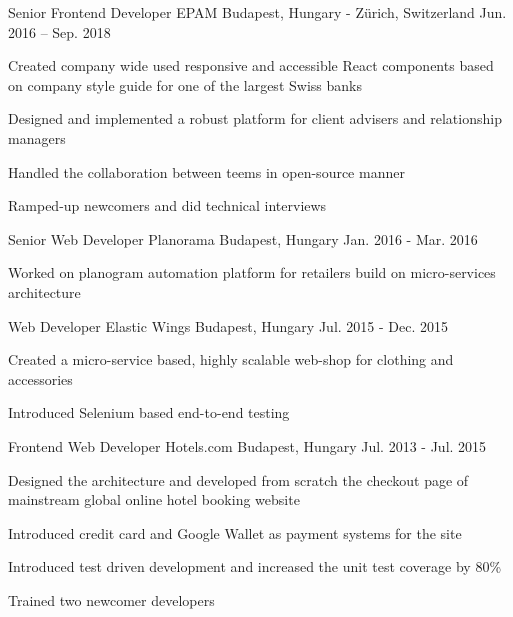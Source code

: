 \begin{cventries}
  \cventry
    {Senior Frontend Developer} %
    {EPAM} %
    {Budapest, Hungary - Zürich, Switzerland} %
    {Jun. 2016 – Sep. 2018} %
    {
      \begin{cvitems} %
        \item {Created company wide used responsive and accessible React components based on company style guide for one of the largest Swiss banks}
        \item {Designed and implemented a robust platform for client advisers and relationship managers}
        \item {Handled the collaboration between teems in open-source manner}
        \item {Ramped-up newcomers and did technical interviews}
      \end{cvitems}
    }

  \cventry
    {Senior Web Developer} %
    {Planorama} %
    {Budapest, Hungary} %
    {Jan. 2016 - Mar. 2016} %
    {
      \begin{cvitems} %
        \item {Worked on planogram automation platform for retailers build on micro-services architecture}
      \end{cvitems}
    }

  \cventry
    {Web Developer} %
    {Elastic Wings} %
    {Budapest, Hungary} %
    {Jul. 2015 - Dec. 2015} %
    {
      \begin{cvitems} %
        \item {Created a micro-service based, highly scalable web-shop for clothing and accessories}
        \item {Introduced Selenium based end-to-end testing}
      \end{cvitems}
    }

  \cventry
    {Frontend Web Developer} %
    {Hotels.com} %
    {Budapest, Hungary} %
    {Jul. 2013 - Jul. 2015} %
    {
      \begin{cvitems} %
        \item {Designed the architecture and developed from scratch the checkout page of mainstream global online hotel booking website}
        \item {Introduced credit card and Google Wallet as payment systems for the site}
        \item {Introduced test driven development and increased the unit test coverage by 80\%}
        \item {Trained two newcomer developers}
      \end{cvitems}
    }


\end{cventries}
